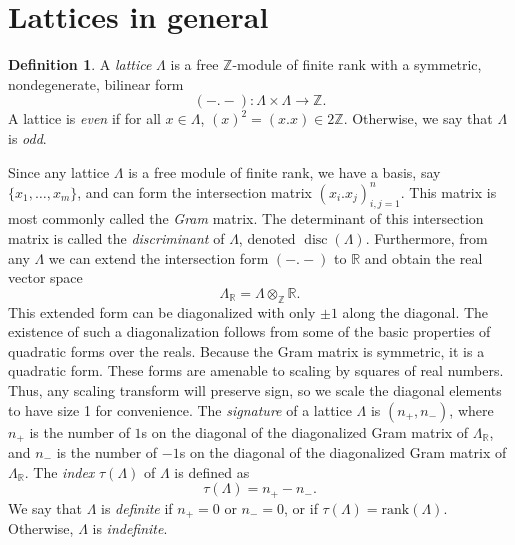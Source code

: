 \documentclass[12pt,twoside]{reedthesis}
\theoremstyle{plain}
\theoremstyle{definition}
\newtheorem{definition}{Definition}[section]
\theoremstyle{remark}
\newcommand{\ZZ}{\mathbb{Z}}
\newcommand{\RR}{\mathbb{R}}
\newcommand{\disc}{\operatorname{disc}}
\begin{document}
\section{Lattices in general}
\begin{definition}
A \emph{lattice} $\Lambda$ is a free $\ZZ$-module of finite rank with a symmetric, nondegenerate, bilinear form
\[
(-.-):\Lambda\times\Lambda\to\ZZ.
\]
A lattice is \emph{even} if for all $x\in\Lambda$, $(x)^2=(x.x)\in2\ZZ$. Otherwise, we say that $\Lambda$ is \emph{odd}. 
\end{definition}
\noindent Since any lattice $\Lambda$ is a free module of finite rank, we have a basis, say $\{x_1,\ldots,x_m\}$, and can form the intersection matrix $(x_i.x_j)_{i,j=1}^n$. This matrix is most commonly called the \emph{Gram} matrix. The determinant of this intersection matrix is called the \emph{discriminant} of $\Lambda$, denoted $\disc(\Lambda)$. Furthermore, from any $\Lambda$ we can extend the intersection form $(-.-)$ to $\RR$ and obtain the real vector space
\[
\Lambda_\RR=\Lambda\otimes_\ZZ\RR.
\]
This extended form can be diagonalized with only $\pm1$ along the diagonal. The existence of such a diagonalization follows from some of the basic properties of quadratic forms over the reals. Because the Gram matrix is symmetric, it is a quadratic form. These forms are amenable to scaling by squares of real numbers. Thus, any scaling transform will preserve sign, so we scale the diagonal elements to have size 1 for convenience. The \emph{signature} of a lattice $\Lambda$ is $(n_+,n_-)$, where $n_+$ is the number of $1$s on the diagonal of the diagonalized Gram matrix of $\Lambda_\RR$, and $n_-$ is the number of $-1$s on the diagonal of the diagonalized Gram matrix of $\Lambda_\RR$. The \emph{index} $\tau(\Lambda)$ of $\Lambda$ is defined as \[\tau(\Lambda)=n_+-n_-.\] We say that $\Lambda$ is \emph{definite} if $n_+=0$ or $n_-=0$, or if $\tau(\Lambda)=\text{rank}(\Lambda)$. Otherwise, $\Lambda$ is \emph{indefinite}.
\end{document}
